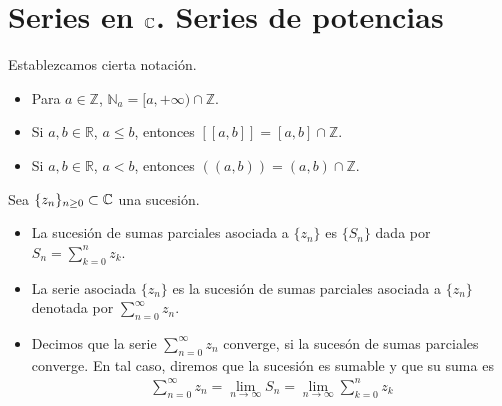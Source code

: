 \chapter{Series en $\mathbb{C}$. Series de potencias}

Establezcamos cierta notación.
\begin{itemize}
    \item Para $a \in \mathbb{Z}$, $\mathbb{N}_a = [a,+\infty) \cap \mathbb{Z}$.
    \item Si $a,b \in \mathbb{R}$, $a \leq b$, entonces $[[a,b]] = [a,b] \cap \mathbb{Z}$.
    \item Si $a,b \in \mathbb{R}$, $a < b$, entonces $((a,b)) = (a,b) \cap \mathbb{Z}$.
\end{itemize}

\begin{defi}
    Sea $\{z_n\}_{n \ge 0} \subset \mathbb{C}$ una sucesión.
    \begin{itemize}
        \item La sucesión de sumas parciales asociada a $\{z_n\}$ es $\{S_n\}$ dada por $S_n = \sum_{k=0}^{n}{z_k}$.
        \item La serie asociada $\{z_n\}$ es la sucesión de sumas parciales asociada a $\{z_n\}$ denotada por $\sum_{n=0}^{\infty}{z_n}$.
        \item Decimos que la serie $\sum_{n=0}^{\infty}{z_n}$ converge, si la sucesón de sumas parciales converge. En tal caso, diremos que la sucesión es sumable y que su suma es
              \begin{align*}
                  \sum_{n=0}^{\infty}{z_n} = \lim_{n \to \infty}{S_n} = \lim_{n \to \infty}\sum_{k=0}^{n}{z_k}
              \end{align*}
    \end{itemize}
\end{defi}

